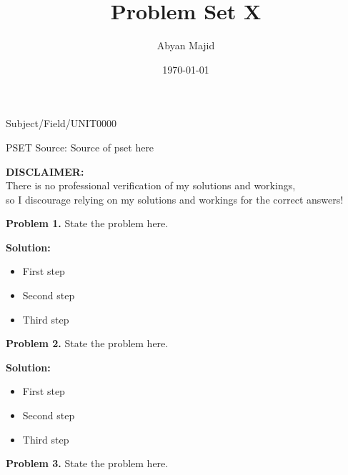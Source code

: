 \documentclass{article}
\theoremstyle{problemstyle}
\newenvironment{boxedproblem}[1]
{\begin{tcolorbox}[colback=white, colframe=black, boxrule=0.5pt]\noindent\textbf{Problem #1.}}
{\end{tcolorbox}}
\begin{document}
\title{Problem Set X}
\author{Abyan Majid}
\date{\today}
\maketitle

\vspace{-0.25cm}
{\centering Subject/Field/UNIT0000 \par}
{\centering PSET Source: Source of pset here \par}

\noindent \hrulefill
\begin{center}
    \textbf{DISCLAIMER:} \\
    There is no professional verification of my solutions and workings, \\
    so I discourage relying on my solutions and workings for the correct answers! \\
\end{center}
\noindent \hrulefill
\vspace{0.25cm}


\begin{boxedproblem}{1}
State the problem here.
\end{boxedproblem}

\textbf{Solution:}
\begin{itemize}[label={},leftmargin=1.25cm,nosep]
    \item First step
    \item Second step
    \item Third step
\end{itemize}


\begin{boxedproblem}{2}
State the problem here.
\end{boxedproblem}

\textbf{Solution:}
\begin{itemize}[label={},leftmargin=1.25cm,nosep]
    \item First step
    \item Second step
    \item Third step
\end{itemize}


\begin{boxedproblem}{3}
State the problem here.
\end{boxedproblem}
\end{document}
